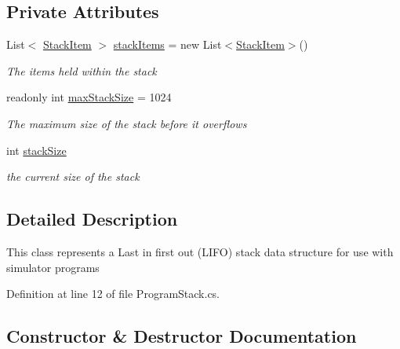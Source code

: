 \subsection*{Private Attributes}
\begin{DoxyCompactItemize}
\item 
List$<$ \hyperlink{class_c_p_u___o_s___simulator_1_1_c_p_u_1_1_stack_item}{Stack\+Item} $>$ \hyperlink{class_c_p_u___o_s___simulator_1_1_c_p_u_1_1_program_stack_ada087487ee69e4e38e2f2591bdc28f37}{stack\+Items} = new List$<$\hyperlink{class_c_p_u___o_s___simulator_1_1_c_p_u_1_1_stack_item}{Stack\+Item}$>$()
\begin{DoxyCompactList}\small\item\em The items held within the stack \end{DoxyCompactList}\item 
readonly int \hyperlink{class_c_p_u___o_s___simulator_1_1_c_p_u_1_1_program_stack_a2e475bb3c8ce48b8b0a86e31b2cb972e}{max\+Stack\+Size} = 1024
\begin{DoxyCompactList}\small\item\em The maximum size of the stack before it overflows \end{DoxyCompactList}\item 
int \hyperlink{class_c_p_u___o_s___simulator_1_1_c_p_u_1_1_program_stack_ab0667a30e4d6e10c3ffddfdfbc084102}{stack\+Size}
\begin{DoxyCompactList}\small\item\em the current size of the stack \end{DoxyCompactList}\end{DoxyCompactItemize}


\subsection{Detailed Description}
This class represents a Last in first out (L\+I\+F\+O) stack data structure for use with simulator programs 



Definition at line 12 of file Program\+Stack.\+cs.



\subsection{Constructor \& Destructor Documentation}
\hypertarget{class_c_p_u___o_s___simulator_1_1_c_p_u_1_1_program_stack_a2a30dfbb7df3408de94c883c44aff090}{}
